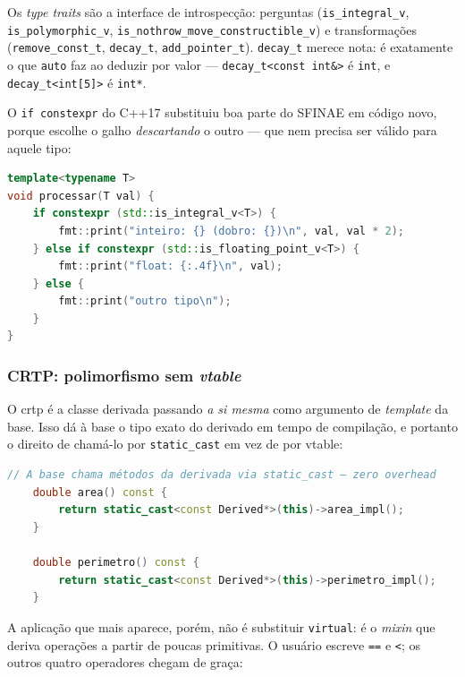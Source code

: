 Os \emph{type traits} são a interface de introspecção: perguntas
(\texttt{is\_integral\_v}, \texttt{is\_polymorphic\_v},
\texttt{is\_nothrow\_move\_constructible\_v}) e transformações
(\texttt{remove\_const\_t}, \texttt{decay\_t}, \texttt{add\_pointer\_t}).
\texttt{decay\_t} merece nota: é exatamente o que \texttt{auto} faz ao deduzir
por valor --- \texttt{decay\_t<const int\&>} é \texttt{int}, e
\texttt{decay\_t<int[5]>} é \texttt{int*}.

O \texttt{if constexpr} do C++17 substituiu boa parte do SFINAE em código novo,
porque escolhe o galho \emph{descartando} o outro --- que nem precisa ser válido
para aquele tipo:

\begin{lstlisting}[style=bt, language=C++,
    caption={Um corpo, três comportamentos, nenhuma sobrecarga.}]
template<typename T>
void processar(T val) {
    if constexpr (std::is_integral_v<T>) {
        fmt::print("inteiro: {} (dobro: {})\n", val, val * 2);
    } else if constexpr (std::is_floating_point_v<T>) {
        fmt::print("float: {:.4f}\n", val);
    } else {
        fmt::print("outro tipo\n");
    }
}
\end{lstlisting}

\subsubsection{CRTP: polimorfismo sem \emph{vtable}}

O \gls{crtp} é a classe derivada passando \emph{a si mesma} como argumento de
\emph{template} da base. Isso dá à base o tipo exato do derivado em tempo de
compilação, e portanto o direito de chamá-lo por \texttt{static\_cast} em vez de
por \gls{vtable}:

\begin{lstlisting}[style=bt, language=C++,
    caption={A base chamando a derivada, em
             \texttt{src/templates/demo\_crtp.hpp}.}]
    // A base chama métodos da derivada via static_cast — zero overhead
    double area() const {
        return static_cast<const Derived*>(this)->area_impl();
    }

    double perimetro() const {
        return static_cast<const Derived*>(this)->perimetro_impl();
    }
\end{lstlisting}

A aplicação que mais aparece, porém, não é substituir \texttt{virtual}: é o
\emph{mixin} que deriva operações a partir de poucas primitivas. O usuário
escreve \texttt{==} e \texttt{<}; os outros quatro operadores chegam de graça:

